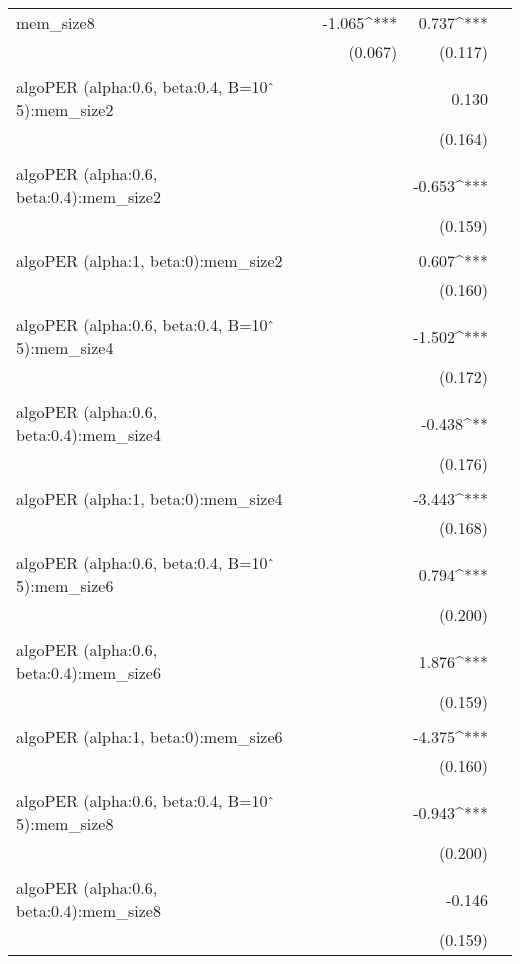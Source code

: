 \begin{table}[!htbp]
\begin{tabular}{@{\extracolsep{5pt}}lD{.}{.}{-3} D{.}{.}{-3} D{.}{.}{-3} }
 mem\_size8 & -1.065^{***} & 0.737^{***} &  \\ 
  & (0.067) & (0.117) &  \\ 
  & & & \\ 
 algoPER (alpha:0.6, beta:0.4, B=10$\hat{\mkern6mu}$5):mem\_size2 &  & 0.130 &  \\ 
  &  & (0.164) &  \\ 
  & & & \\ 
 algoPER (alpha:0.6, beta:0.4):mem\_size2 &  & -0.653^{***} &  \\ 
  &  & (0.159) &  \\ 
  & & & \\ 
 algoPER (alpha:1, beta:0):mem\_size2 &  & 0.607^{***} &  \\ 
  &  & (0.160) &  \\ 
  & & & \\ 
 algoPER (alpha:0.6, beta:0.4, B=10$\hat{\mkern6mu}$5):mem\_size4 &  & -1.502^{***} &  \\ 
  &  & (0.172) &  \\ 
  & & & \\ 
 algoPER (alpha:0.6, beta:0.4):mem\_size4 &  & -0.438^{**} &  \\ 
  &  & (0.176) &  \\ 
  & & & \\ 
 algoPER (alpha:1, beta:0):mem\_size4 &  & -3.443^{***} &  \\ 
  &  & (0.168) &  \\ 
  & & & \\ 
 algoPER (alpha:0.6, beta:0.4, B=10$\hat{\mkern6mu}$5):mem\_size6 &  & 0.794^{***} &  \\ 
  &  & (0.200) &  \\ 
  & & & \\ 
 algoPER (alpha:0.6, beta:0.4):mem\_size6 &  & 1.876^{***} &  \\ 
  &  & (0.159) &  \\ 
  & & & \\ 
 algoPER (alpha:1, beta:0):mem\_size6 &  & -4.375^{***} &  \\ 
  &  & (0.160) &  \\ 
  & & & \\ 
 algoPER (alpha:0.6, beta:0.4, B=10$\hat{\mkern6mu}$5):mem\_size8 &  & -0.943^{***} &  \\ 
  &  & (0.200) &  \\ 
  & & & \\ 
 algoPER (alpha:0.6, beta:0.4):mem\_size8 &  & -0.146 &  \\ 
  &  & (0.159) &  \\ 

\end{tabular}
\end{table}
